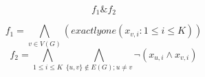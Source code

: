 $$f_{1} \& f_{2}$$

$$f_{1}=\bigwedge \limits_{v \in V(G)}(exactlyone(x_{v,i} : 1\leq i\leq K))$$
$$f_{2}=\bigwedge \limits_{1 \leq i \leq K} \bigwedge \limits_{\{u, v \} \notin E(G); u\neq v } \neg(x_{u,i} \wedge x_{v,i} )$$

